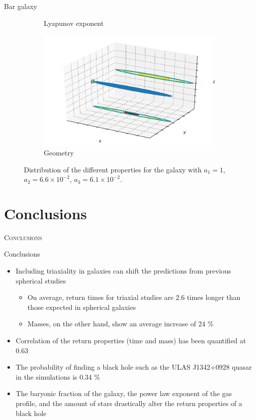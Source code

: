 \documentclass{beamer}
\begin{document}
\begin{frame}{Bar galaxy}
\begin{figure}[h]
\begin{subfigure}[t]{0.35\textwidth}
			\caption{Lyapunov exponent}
		\end{subfigure}
		\begin{subfigure}[t]{0.35\textwidth}
			\includegraphics[width=\textwidth]{"../Files/Week 13/images/22_ellipsoid"}
			\caption{Geometry}
		\end{subfigure}
		\caption{Distribution of the different properties for the galaxy with $a_1 = 1$, $a_2 = 6.6\times10^{-2}$, $a_3 = 6.1\times10^{-2}$.}
	\end{figure}
\end{frame}

\section{Conclusions}
\begin{frame}
	\centering
	\Huge
	\scshape
	Conclusions
\end{frame}

\begin{frame}{Conclusions}
	\begin{itemize}
		\item Including triaxiality in galaxies can shift the predictions from previous spherical studies
		\begin{itemize}
			\item On average, return times for triaxial studies are 2.6 times longer than those	expected in spherical galaxies
			\item Masses, on the other hand, show an average increase of 24 \%
		\end{itemize}
		\item Correlation of the return properties (time and mass) has been quantified at 0.63
		\item The probability of finding a black hole such as the ULAS J1342+0928 quasar in the simulations is 0.34 \%
		\item The baryonic fraction of the galaxy, the power law
		exponent of the gas profile, and the amount of stars drastically alter the return properties of a black hole
	\end{itemize}
\end{frame}
\end{document}
